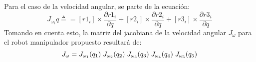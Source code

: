     Para el caso de la velocidad angular, se parte de la ecuación:
    \begin{equation*}
        J_{\omega _i}q \triangleq = [r1_i] \times\frac{\partial r1_i}{\partial q} + [r2_i] \times\frac{\partial r2_i}{\partial q}
                                    + [r3_i] \times\frac{\partial r3_i}{\partial q}
    \end{equation*}
    Tomando en cuenta esto, la matriz del jacobiana de la velocidad angular $J_{\omega}$ para el robot manipulador propuesto
    resultará de:
    \begin{equation*}
        J_\omega = J_{\omega_1}(q_1) \hspace{1mm} J_{\omega_2}(q_2) \hspace{1mm} J_{\omega_3}(q_3) \hspace{1mm} J_{\omega_4}(q_4) \hspace{1mm} J_{\omega_5}(q_5)
    \end{equation*}